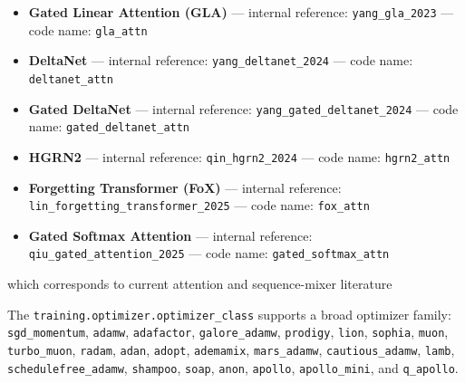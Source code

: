 \documentclass[11pt,a4paper]{article}
\begin{document}
\begin{itemize}[leftmargin=*]
    \item \textbf{Gated Linear Attention (GLA)} --- internal reference: \texttt{yang\_gla\_2023} --- code name: \texttt{gla\_attn}
    \item \textbf{DeltaNet} --- internal reference: \texttt{yang\_deltanet\_2024} --- code name: \texttt{deltanet\_attn}
    \item \textbf{Gated DeltaNet} --- internal reference: \texttt{yang\_gated\_deltanet\_2024} --- code name: \texttt{gated\_deltanet\_attn}
    \item \textbf{HGRN2} --- internal reference: \texttt{qin\_hgrn2\_2024} --- code name: \texttt{hgrn2\_attn}
    \item \textbf{Forgetting Transformer (FoX)} --- internal reference: \texttt{lin\_forgetting\_transformer\_2025} --- code name: \texttt{fox\_attn}
    \item \textbf{Gated Softmax Attention} --- internal reference: \texttt{qiu\_gated\_attention\_2025} --- code name: \texttt{gated\_softmax\_attn}
\end{itemize}

which corresponds to current attention and sequence-mixer literature \citep{sun_retentive_2023,gu_mamba_2023,zhang_continuous_2021,behrouz_titans_2025,ramapuram_theory_2024,vaswani_attention_2017,child_sparse_transformer_2019,beltagy_longformer_2020,zaheer_bigbird_2020,lou_sparsek_2024,yuan_nsa_2025,zhang_spargeattn_2025,wang_fasa_2026,yang_gla_2023,yang_deltanet_2024,yang_gated_deltanet_2024,qin_hgrn2_2024,lin_forgetting_transformer_2025,qiu_gated_attention_2025}

The \texttt{training.optimizer.optimizer\_class} supports a broad optimizer family:
\texttt{sgd\_momentum}, \texttt{adamw}, \texttt{adafactor}, \texttt{galore\_adamw}, \texttt{prodigy}, \texttt{lion}, \texttt{sophia}, \texttt{muon}, \texttt{turbo\_muon}, \texttt{radam}, \texttt{adan}, \texttt{adopt}, \texttt{ademamix}, \texttt{mars\_adamw}, \texttt{cautious\_adamw}, \texttt{lamb}, \texttt{schedulefree\_adamw}, \texttt{shampoo}, \texttt{soap}, \texttt{anon}, \texttt{apollo}, \texttt{apollo\_mini}, and \texttt{q\_apollo}.
\end{document}
